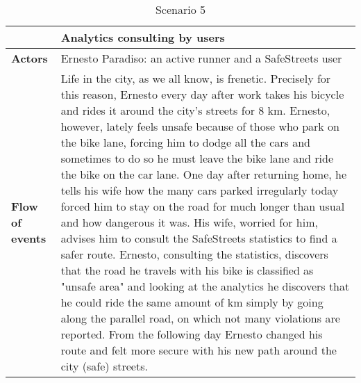 \begin{table}[!htbp]
	\centering
\begin{tabular}{lp{9cm}}
\hline
\bf\large  &\bf\large Analytics consulting by users\\
\hline
\hline

\bf Actors&Ernesto Paradiso: an active runner and a SafeStreets user\\
\hline
\bf Flow of events&
Life in the city, as we all know, is frenetic. Precisely for this reason, Ernesto every day after work takes his bicycle and rides it around the city's streets for 8 km.
Ernesto, however, lately feels unsafe because of those who park on the bike lane, forcing him to dodge all the cars and sometimes to do so he must leave the bike lane and ride the bike on the car lane.
One day after returning home, he tells his wife how the many cars parked irregularly today forced him to stay on the road for much longer than usual and how dangerous it was.
His wife, worried for him, advises him to consult the SafeStreets statistics to find a safer route.
Ernesto, consulting the statistics, discovers that the road he travels with his bike is classified as "unsafe area" and looking at the analytics he discovers that he could ride the same amount of km simply by going along the parallel road, on which not many violations are reported.
From the following day Ernesto changed his route and felt more secure with his new path around the city (safe) streets.
\end{tabular}
\caption{Scenario 5} 
\label{tab:scenariofive}
\end{table}